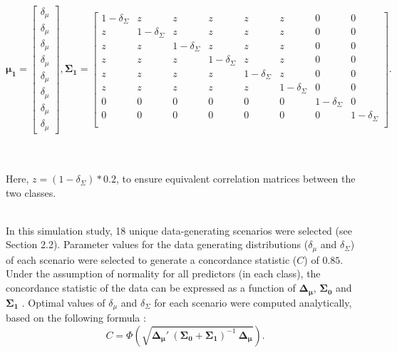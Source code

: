 \documentclass[AMA,STIX1COL,]{WileyNJD-v2}
\begin{document}
\begin{equation*}
\pmb{\mu_1} = \begin{bmatrix}
 \delta_\mu \\ \delta_\mu \\ \delta_\mu \\ \delta_\mu \\ \delta_\mu \\ \delta_\mu \\ \delta_\mu \\ \delta_\mu
\end{bmatrix}, \pmb{\Sigma_1} = \begin{bmatrix}
1 - \delta_\Sigma   & z & z & z & z & z & 0 & 0\\
z & 1 - \delta_\Sigma   & z & z & z & z & 0 & 0\\
z & z & 1 - \delta_\Sigma   & z & z & z & 0 & 0\\
z & z & z   & 1 - \delta_\Sigma & z & z & 0 & 0\\
z & z & z   & z & 1 - \delta_\Sigma & z & 0 & 0\\
z & z & z   & z & z & 1 - \delta_\Sigma & 0 & 0\\
0   & 0   & 0     &  0 & 0    & 0 & 1 - \delta_\Sigma & 0\\
0   & 0   & 0     &  0 & 0    & 0 & 0 & 1 - \delta_\Sigma\\
\end{bmatrix}.
\end{equation*}\\
\strut \\
Here, \(z = (1-\delta_\Sigma)*0.2\), to ensure equivalent correlation
matrices between the two classes.\\
\strut \\
In this simulation study, 18 unique data-generating scenarios were
selected (see Section 2.2). Parameter values for the data generating
distributions (\(\delta_\mu\) and \(\delta_\Sigma\)) of each scenario
were selected to generate a concordance statistic (\(C\)) of \(0.85\).
Under the assumption of normality for all predictors (in each class),
the concordance statistic of the data can be expressed as a function of
\(\pmb{\Delta_\mu}\), \(\pmb{\Sigma_0}\) and \(\pmb{\Sigma_1}\)
\citep{mvauc}. Optimal values of \(\delta_\mu\) and \(\delta_\Sigma\)
for each scenario were computed analytically, based on the following
formula \citep{mvauc}:\\
\begin{equation}
C = \Phi \left( \sqrt{\pmb{\Delta_\mu}{'}\  (\pmb{\Sigma_0} + \pmb{\Sigma_1})^{-1} \ \pmb{\Delta_{\mu}}} \right).
\end{equation}\\
\end{document}
